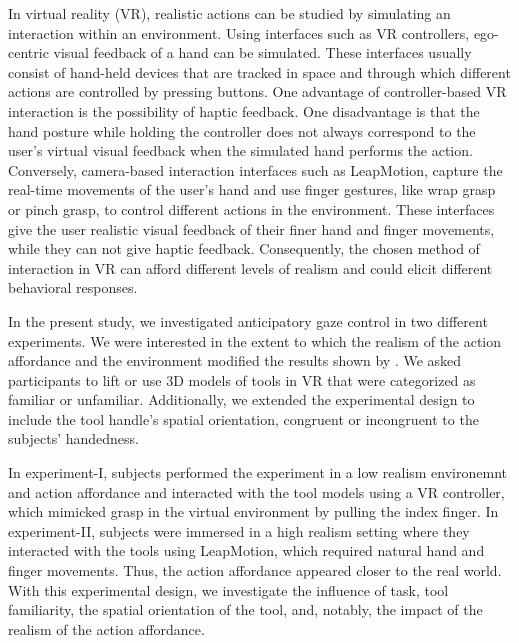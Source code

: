 In virtual reality (VR), realistic actions can be studied by simulating an interaction within an environment. Using interfaces such as VR controllers, ego-centric visual feedback of a hand can be simulated. These interfaces usually consist of hand-held devices that are tracked in space and through which different actions are controlled by pressing buttons. One advantage of controller-based VR interaction is the possibility of haptic feedback. One disadvantage is that the hand posture while holding the controller does not always correspond to the user’s virtual visual feedback when the simulated hand performs the action. Conversely, camera-based interaction interfaces such as LeapMotion, capture the real-time movements of the user’s hand and use finger gestures, like wrap grasp or pinch grasp, to control different actions in the environment. These interfaces give the user realistic visual feedback of their finer hand and finger movements, while they can not give haptic feedback. Consequently, the chosen method of interaction in VR can afford different levels of realism and could elicit different behavioral responses.

In the present study, we investigated anticipatory gaze control in two different experiments. We were interested in the extent to which the realism of the action affordance and the environment modified the results shown by \citet{Belardinelli2016-xb}. We asked participants to lift or use 3D models of tools in VR that were categorized as familiar or unfamiliar. Additionally, we extended the experimental design to include the tool handle’s spatial orientation, congruent or incongruent to the subjects’ handedness. 

In experiment-I, subjects performed the experiment in a low realism environemnt and action affordance and interacted with the tool models using a VR controller, which mimicked grasp in the virtual environment by pulling the index finger. In experiment-II, subjects were immersed in a high realism setting where they interacted with the tools using LeapMotion, which required natural hand and finger movements. Thus, the action affordance appeared closer to the real world. With this experimental design, we investigate the influence of task, tool familiarity, the spatial orientation of the tool, and, notably, the impact of the realism of the action affordance. 


